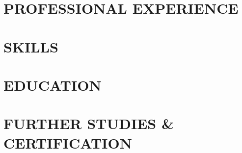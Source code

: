 \documentclass[12pt, letterpaper]{report}
\begin{document}
\paperHeader
\vspace{-.8cm}
\section{\faBriefcase \space PROFESSIONAL EXPERIENCE}
\resumeSubHeadingList
\treon
\tampere
\nokia
\resumeSubHeadingListEnd
\vspace{-.8cm}
\newlength{\rowSpace}
\setlength{\rowSpace}{1.8mm}
\section{\faPuzzlePiece\space SKILLS}
\generalSkills
\vspace{-.6cm}
\section{\faGraduationCap\space EDUCATION}
\resumeSubHeadingList
\eduTampere
\eduNodet
\resumeSubHeadingListEnd
\section{\faBook\space FURTHER STUDIES \& CERTIFICATION}
\certGeneral
\end{document}
